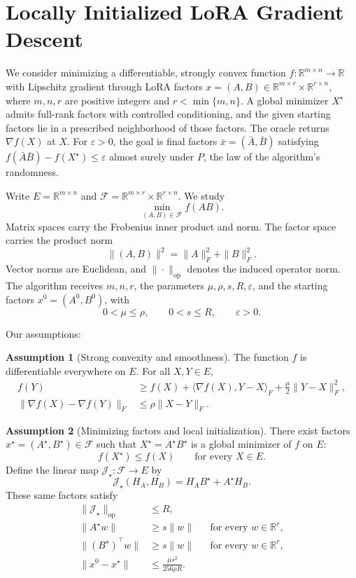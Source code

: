 \documentclass[10pt]{article}
\theoremstyle{definition}
\newtheorem{assumption}{Assumption}
\begin{document}
\section*{Locally Initialized LoRA Gradient Descent}
We consider minimizing a differentiable, strongly convex function $f:\mathbb{R}^{m\times n}\to\mathbb{R}$ with Lipschitz gradient through LoRA factors $x=(A,B)\in\mathbb{R}^{m\times r}\times\mathbb{R}^{r\times n}$, where $m,n,r$ are positive integers and $r<\min\{m,n\}$. A global minimizer $X^\star$ admits full-rank factors with controlled conditioning, and the given starting factors lie in a prescribed neighborhood of those factors. The oracle returns $\nabla f(X)$ at $X$. For $\varepsilon>0$, the goal is final factors $\bar{x}=(\bar{A},\bar{B})$ satisfying $f(\bar{A}\bar{B})-f(X^\star)\leq\varepsilon$ almost surely under $P$, the law of the algorithm's randomness.

Write $E=\mathbb{R}^{m\times n}$ and $\mathcal{F}=\mathbb{R}^{m\times r}\times\mathbb{R}^{r\times n}$. We study
\[
\min_{(A,B)\in\mathcal{F}} f(AB).
\]
Matrix spaces carry the Frobenius inner product and norm. The factor space carries the product norm
\[
\|(A,B)\|^2=\|A\|_F^2+\|B\|_F^2.
\]
Vector norms are Euclidean, and $\|\cdot\|_{\mathrm{op}}$ denotes the induced operator norm. The algorithm receives $m,n,r$, the parameters $\mu,\rho,s,R,\varepsilon$, and the starting factors $x^0=(A^0,B^0)$, with
\[
0<\mu\leq\rho,\qquad 0<s\leq R,\qquad \varepsilon>0.
\]

Our assumptions:
\begin{assumption}[Strong convexity and smoothness]
The function $f$ is differentiable everywhere on $E$. For all $X,Y\in E$,
\[
\begin{aligned}
f(Y)&\geq f(X)+\langle\nabla f(X),Y-X\rangle_F
             +\frac{\mu}{2}\|Y-X\|_F^2,\\
\|\nabla f(X)-\nabla f(Y)\|_F&\leq\rho\|X-Y\|_F.
\end{aligned}
\]
\end{assumption}

\begin{assumption}[Minimizing factors and local initialization]
There exist factors $x^\star=(A^\star,B^\star)\in\mathcal{F}$ such that $X^\star=A^\star B^\star$ is a global minimizer of $f$ on $E$:
\[
f(X^\star)\leq f(X)\qquad\text{for every }X\in E.
\]
Define the linear map $\mathcal{J}_\star:\mathcal{F}\to E$ by
\[
\mathcal{J}_\star(H_A,H_B)=H_A B^\star+A^\star H_B.
\]
These same factors satisfy
\[
\begin{aligned}
\|\mathcal{J}_\star\|_{\mathrm{op}}&\leq R,\\
\|A^\star w\|&\geq s\|w\| &&\text{for every }w\in\mathbb{R}^r,\\
\|(B^\star)^\top w\|&\geq s\|w\| &&\text{for every }w\in\mathbb{R}^r,\\
\|x^0-x^\star\|&\leq\frac{\mu s^2}{256\rho R}.
\end{aligned}
\]
\end{assumption}
\end{document}
